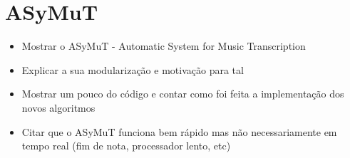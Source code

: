 \section{ASyMuT}
\label{sec:asymut}

\begin{itemize}
\item Mostrar o ASyMuT - Automatic System for Music Transcription
\item Explicar a sua modularização e motivação para tal
\item Mostrar um pouco do código e contar como foi feita a implementação dos novos algoritmos
\item Citar que o ASyMuT funciona bem rápido mas não necessariamente em tempo real (fim de nota, processador lento, etc)
\end{itemize}
